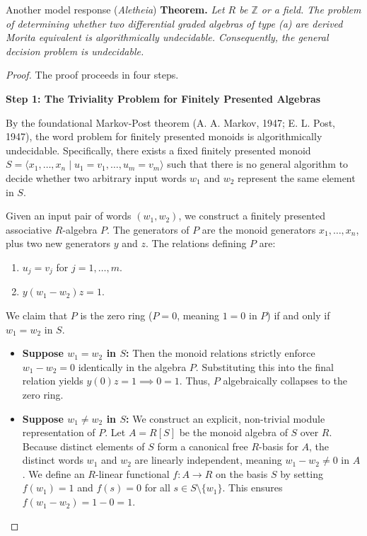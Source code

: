 \documentclass{article}
\theoremstyle{plain}
\theoremstyle{definition}
\begin{document}
\begin{solution}{Another model response (\emph{Aletheia})}
\textbf{Theorem.} \textit{Let $R$ be $\mathbb{Z}$ or a field. The problem of determining whether two differential graded algebras of type (a) are derived Morita equivalent is algorithmically undecidable. Consequently, the general decision problem is undecidable.}

\begin{proof}
The proof proceeds in four steps.

\textbf{Step 1: The Triviality Problem for Finitely Presented Algebras}

By the foundational Markov-Post theorem (A. A. Markov, 1947; E. L. Post, 1947), the word problem for finitely presented monoids is algorithmically undecidable. Specifically, there exists a fixed finitely presented monoid $S = \langle x_1, \dots, x_n \mid u_1 = v_1, \dots, u_m = v_m \rangle$ such that there is no general algorithm to decide whether two arbitrary input words $w_1$ and $w_2$ represent the same element in $S$.

Given an input pair of words $(w_1, w_2)$, we construct a finitely presented associative $R$-algebra $P$. The generators of $P$ are the monoid generators $x_1, \dots, x_n$, plus two new generators $y$ and $z$. The relations defining $P$ are:
\begin{enumerate}
    \item $u_j = v_j$ for $j = 1, \dots, m$.
    \item $y(w_1 - w_2)z = 1$.
\end{enumerate}

We claim that $P$ is the zero ring ($P = 0$, meaning $1 = 0$ in $P$) if and only if $w_1 = w_2$ in $S$.

\begin{itemize}
    \item \textbf{Suppose $w_1 = w_2$ in $S$:} Then the monoid relations strictly enforce $w_1 - w_2 = 0$ identically in the algebra $P$. Substituting this into the final relation yields $y(0)z = 1 \implies 0 = 1$. Thus, $P$ algebraically collapses to the zero ring.

    \item \textbf{Suppose $w_1 \neq w_2$ in $S$:} We construct an explicit, non-trivial module representation of $P$. Let $A = R[S]$ be the monoid algebra of $S$ over $R$. Because distinct elements of $S$ form a canonical free $R$-basis for $A$, the distinct words $w_1$ and $w_2$ are linearly independent, meaning $w_1 - w_2 \neq 0$ in $A$. We define an $R$-linear functional $f: A \to R$ on the basis $S$ by setting $f(w_1) = 1$ and $f(s) = 0$ for all $s \in S \setminus \{w_1\}$. This ensures $f(w_1 - w_2) = 1 - 0 = 1$.


\end{itemize}
\end{proof}
\end{solution}
\end{document}
